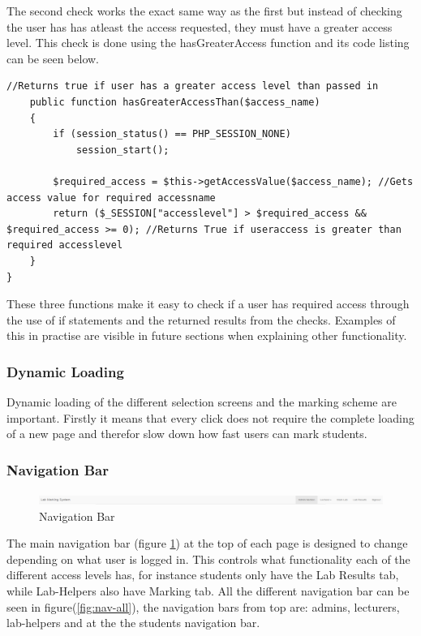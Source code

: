 \documentclass[12pt]{article}  %
\begin{document}
\noindent The second check works the exact same way as the first but instead of checking the user has has atleast the access requested, they must have a greater access level. This check is done using the hasGreaterAccess function and its code listing can be seen below.

\singlespacing
\begin{lstlisting}[caption= Has Great Access Than - PHP, label = lst:security-greater]
    //Returns true if user has a greater access level than passed in
    public function hasGreaterAccessThan($access_name)
    {
        if (session_status() == PHP_SESSION_NONE)
            session_start();

        $required_access = $this->getAccessValue($access_name); //Gets access value for required accessname
        return ($_SESSION["accesslevel"] > $required_access && $required_access >= 0); //Returns True if useraccess is greater than required accesslevel
    }
}
\end{lstlisting}
\doublespacing


\noindent These three functions make it easy to check if a user has required access through the use of if statements and the returned results from the checks. Examples of this in practise are visible in future sections when explaining other functionality. 


\subsubsection{Dynamic Loading}

Dynamic loading of the different selection screens and the marking scheme are important. Firstly it means that every click does not require the complete loading of a new page and therefor slow down how fast users can mark students.

\subsubsection{Navigation Bar}

\begin{figure}[H]
    \centering
    \includegraphics[width=1\textwidth]{images/implementation/nav-bar.png}
    \caption{Navigation Bar}
    \label{fig:nav-bar}
\end{figure}

The main navigation bar (figure \ref{fig:nav-bar}) at the top of each page is designed to change depending on what user is logged in. This controls what functionality each of the different access levels has, for instance students only have the Lab Results tab, while Lab-Helpers also have Marking tab. All the different navigation bar can be seen in figure(\ref{fig:nav-all}), the navigation bars from top are: admins, lecturers, lab-helpers and at the the students navigation bar.  
\end{document}
